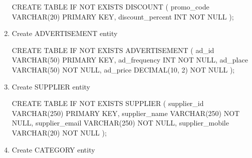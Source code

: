 \documentclass[
  letterpaper,
  DIV=11,
  numbers=noendperiod]{scrartcl}
\newenvironment{Shaded}{\begin{snugshade}}{\end{snugshade}}
\newcommand{\ControlFlowTok}[1]{\textcolor[rgb]{0.00,0.23,0.31}{#1}}
\newcommand{\DataTypeTok}[1]{\textcolor[rgb]{0.68,0.00,0.00}{#1}}
\newcommand{\DecValTok}[1]{\textcolor[rgb]{0.68,0.00,0.00}{#1}}
\newcommand{\KeywordTok}[1]{\textcolor[rgb]{0.00,0.23,0.31}{#1}}
\newcommand{\NormalTok}[1]{\textcolor[rgb]{0.00,0.23,0.31}{#1}}
\begin{document}
\begin{enumerate}
\begin{Shaded}
\begin{Highlighting}[]
\KeywordTok{CREATE} \KeywordTok{TABLE} \ControlFlowTok{IF} \KeywordTok{NOT} \KeywordTok{EXISTS}\NormalTok{ DISCOUNT (}
\NormalTok{  promo\_code }\DataTypeTok{VARCHAR}\NormalTok{(}\DecValTok{20}\NormalTok{) }\KeywordTok{PRIMARY} \KeywordTok{KEY}\NormalTok{, }
\NormalTok{  discount\_percent }\DataTypeTok{INT} \KeywordTok{NOT} \KeywordTok{NULL}
\NormalTok{);}
\end{Highlighting}
\end{Shaded}
\item
  Create ADVERTISEMENT entity

\begin{Shaded}
\begin{Highlighting}[]
\KeywordTok{CREATE} \KeywordTok{TABLE} \ControlFlowTok{IF} \KeywordTok{NOT} \KeywordTok{EXISTS}\NormalTok{ ADVERTISEMENT (}
\NormalTok{  ad\_id }\DataTypeTok{VARCHAR}\NormalTok{(}\DecValTok{50}\NormalTok{) }\KeywordTok{PRIMARY} \KeywordTok{KEY}\NormalTok{, }
\NormalTok{  ad\_frequency }\DataTypeTok{INT} \KeywordTok{NOT} \KeywordTok{NULL}\NormalTok{,}
\NormalTok{  ad\_place }\DataTypeTok{VARCHAR}\NormalTok{(}\DecValTok{50}\NormalTok{) }\KeywordTok{NOT} \KeywordTok{NULL}\NormalTok{,}
\NormalTok{  ad\_price }\DataTypeTok{DECIMAL}\NormalTok{(}\DecValTok{10}\NormalTok{, }\DecValTok{2}\NormalTok{) }\KeywordTok{NOT} \KeywordTok{NULL}
\NormalTok{);}
\end{Highlighting}
\end{Shaded}
\item
  Create SUPPLIER entity

\begin{Shaded}
\begin{Highlighting}[]
\KeywordTok{CREATE} \KeywordTok{TABLE} \ControlFlowTok{IF} \KeywordTok{NOT} \KeywordTok{EXISTS}\NormalTok{ SUPPLIER (}
\NormalTok{  supplier\_id }\DataTypeTok{VARCHAR}\NormalTok{(}\DecValTok{250}\NormalTok{) }\KeywordTok{PRIMARY} \KeywordTok{KEY}\NormalTok{, }
\NormalTok{  supplier\_name }\DataTypeTok{VARCHAR}\NormalTok{(}\DecValTok{250}\NormalTok{) }\KeywordTok{NOT} \KeywordTok{NULL}\NormalTok{,}
\NormalTok{  supplier\_email }\DataTypeTok{VARCHAR}\NormalTok{(}\DecValTok{250}\NormalTok{) }\KeywordTok{NOT} \KeywordTok{NULL}\NormalTok{,}
\NormalTok{  supplier\_mobile }\DataTypeTok{VARCHAR}\NormalTok{(}\DecValTok{20}\NormalTok{) }\KeywordTok{NOT} \KeywordTok{NULL}
\NormalTok{);}
\end{Highlighting}
\end{Shaded}
\item
  Create CATEGORY entity


\end{enumerate}
\end{document}
